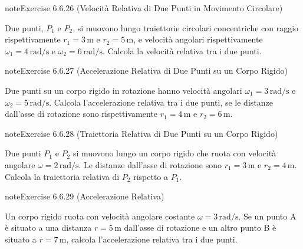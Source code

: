 \documentclass[letterpaper,10pt,italian]{jupyterBook}
\begin{document}
\begin{sphinxadmonition}{note}{Exercise 6.6.26 (Velocità Relativa di Due Punti in Movimento Circolare)}



\sphinxAtStartPar
Due punti, \(P_1\) e \(P_2\), si muovono lungo traiettorie circolari concentriche con raggio rispettivamente \(r_1 = 3 \, \text{m}\) e \(r_2 = 5 \, \text{m}\), e velocità angolari rispettivamente \(\omega_1 = 4 \, \text{rad/s}\) e \(\omega_2 = 6 \, \text{rad/s}\). Calcola la velocità relativa tra i due punti.
\end{sphinxadmonition}
 \label{exercise:ch/mechanics/kinematics-problems-exercise-26}

\begin{sphinxadmonition}{note}{Exercise 6.6.27 (Accelerazione Relativa di Due Punti su un Corpo Rigido)}



\sphinxAtStartPar
Due punti su un corpo rigido in rotazione hanno velocità angolari \(\omega_1 = 3 \, \text{rad/s}\) e \(\omega_2 = 5 \, \text{rad/s}\). Calcola l’accelerazione relativa tra i due punti, se le distanze dall’asse di rotazione sono rispettivamente \(r_1 = 4 \, \text{m}\) e \(r_2 = 6 \, \text{m}\).
\end{sphinxadmonition}
 \label{exercise:ch/mechanics/kinematics-problems-exercise-27}

\begin{sphinxadmonition}{note}{Exercise 6.6.28 (Traiettoria Relativa di Due Punti su un Corpo Rigido)}



\sphinxAtStartPar
Due punti \(P_1\) e \(P_2\) si muovono lungo un corpo rigido che ruota con velocità angolare \(\omega = 2 \, \text{rad/s}\). Le distanze dall’asse di rotazione sono \(r_1 = 3 \, \text{m}\) e \(r_2 = 4 \, \text{m}\). Calcola la traiettoria relativa di \(P_2\) rispetto a \(P_1\).
\end{sphinxadmonition}
 \label{exercise:ch/mechanics/kinematics-problems-exercise-28}

\begin{sphinxadmonition}{note}{Exercise 6.6.29 (Accelerazione Relativa)}



\sphinxAtStartPar
Un corpo rigido ruota con velocità angolare costante \(\omega = 3 \, \text{rad/s}\). Se un punto A è situato a una distanza \(r = 5 \, \text{m}\) dall’asse di rotazione e un altro punto B è situato a \(r = 7 \, \text{m}\), calcola l’accelerazione relativa tra i due punti.
\end{sphinxadmonition}
\end{document}
